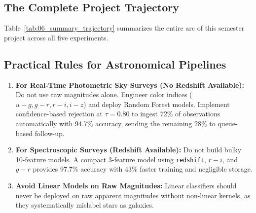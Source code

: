 \documentclass[11pt,a4paper]{article}
\begin{document}
\subsection{The Complete Project Trajectory}
Table~\ref{tab:06_summary_trajectory} summarizes the entire arc of this semester project across all five experiments.

\begin{table}[H]
\centering
\small
\caption{\textbf{Complete Project Performance Trajectory} across the five experimental phases.}
\label{tab:06_summary_trajectory}
\end{table}

\subsection{Practical Rules for Astronomical Pipelines}
\begin{enumerate}[noitemsep]
    \item \textbf{For Real-Time Photometric Sky Surveys (No Redshift Available):}  
    Do not use raw magnitudes alone. Engineer color indices ($u-g, g-r, r-i, i-z$) and deploy Random Forest models. Implement confidence-based rejection at $\tau = 0.80$ to ingest 72\% of observations automatically with 94.7\% accuracy, sending the remaining 28\% to queue-based follow-up.
    \item \textbf{For Spectroscopic Surveys (Redshift Available):}  
    Do not build bulky 10-feature models. A compact 3-feature model using \texttt{redshift}, $r-i$, and $g-r$ provides 97.7\% accuracy with 43\% faster training and negligible storage.
    \item \textbf{Avoid Linear Models on Raw Magnitudes:}  
    Linear classifiers should never be deployed on raw apparent magnitudes without non-linear kernels, as they systematically mislabel stars as galaxies.
\end{enumerate}
\end{document}
